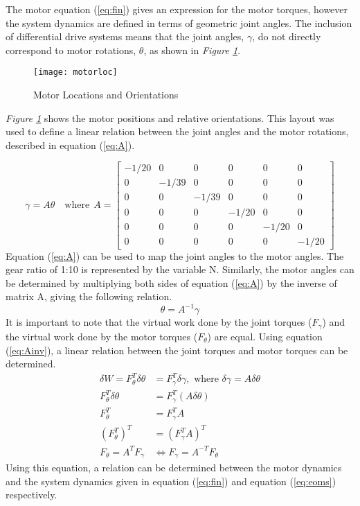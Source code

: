 The motor equation (\ref{eq:fin}) gives an expression for the motor torques, however the system dynamics are defined in terms of geometric joint angles. The inclusion of differential drive systems means that the joint angles, $\gamma$, do not directly correspond to motor rotations, $\theta$, as shown in \emph{Figure \ref{fig:motorloc}}.


\begin{figure}[htp]
  \center
  \texttt{[image: motorloc]}
  \caption{Motor Locations and Orientations}
  \label{fig:motorloc}
\end{figure}

\emph{Figure \ref{fig:motorloc}} shows the motor positions and relative orientations.
This layout was used to define a linear relation between the joint angles and the motor rotations, described in equation (\ref{eq:A}).

\begin{equation}
  \gamma = A\theta\quad \text{where}~~A=\left[\begin{array}{cccccc}
  -1/20 & 0 & {0} & {0} & {0} & {0} \\
   0 & -1/39 & {0} & {0} & {0} & {0} \\
    {0} & {0} & -1/39 & {0} & {0} & {0} \\
    {0} & {0} & {0} & -1/20 & {0} & {0} \\
     {0} & {0} & {0} & {0} & -1/20 & 0\\
      {0} & {0} & {0} & {0} & 0 & -1/20
    \end{array}\right]
\label{eq:A}
\end{equation}
Equation (\ref{eq:A}) can be used to map the joint angles to the motor angles. The gear ratio of 1:10 is represented by the variable N. Similarly, the motor angles can be determined by multiplying both sides of equation (\ref{eq:A}) by the inverse of matrix A, giving the following relation.
\begin{equation}
\theta=A^{-1} \gamma
\label{eq:Ainv}
\end{equation}
It is important to note that the virtual work done by the joint torques ($F_{\gamma}$) and the virtual work done by the motor torques ($F_{\theta}$) are equal. Using equation (\ref{eq:Ainv}), a linear relation between the joint torques and motor torques can be determined.
\[
\begin{aligned}
  \delta W = F_{\theta}^{T} \delta \theta&=F_{\gamma}^{T} \delta \gamma, \text { where } \delta \gamma=A \delta \theta \\
  F_{\theta}^{T} \delta \theta &= F_{\gamma}^{T}(A \delta \theta) \\
  F_{\theta}^{T}&=F_{\gamma}^{T} A\\
  \left(F_{\theta}^{T}\right)^{T}&=\left(F_{\gamma}^{T} A\right)^{T}\\
  F_{\theta}=A^{T} F_{\gamma} &\Leftrightarrow F_{\gamma}=A^{-T} F_{\theta}\qquad\quad
\end{aligned}
\]
Using this equation, a relation can be determined between the motor dynamics and the system dynamics given in equation (\ref{eq:fin}) and equation (\ref{eq:eoms}) respectively.

